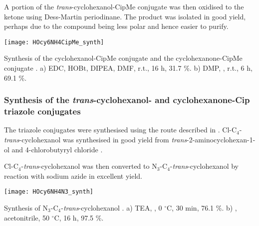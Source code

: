A portion of the \textit{trans}-cyclohexanol-CipMe conjugate  was then oxidised to the ketone using Dess-Martin periodinane. The product was isolated in good yield, perhaps due to the compound being less polar and hence easier to purify.

\begin{scheme}[H]
	\begin{center}
		\texttt{[image: HOcy6NH4CipMe\_synth]}
		\caption{Synthesis of the cyclohexanol-CipMe conjugate  and the cyclohexanone-CipMe conjugate . 
		a) EDC, HOBt, DIPEA, DMF, r.t., 16 h, 31.7 \%.
		b) DMP, , r.t., 6 h, 69.1 \%.
		\label{sch:HOcy6NH4CipMe_synth}}
	\end{center}
\end{scheme}

\subsubsection{Synthesis of the \textit{trans}-cyclohexanol- and cyclohexanone-Cip triazole conjugates}

The triazole conjugates were synthesised using the route described in \label{sec:Cl4Cl}. Cl-C$_4$-\textit{trans}-cyclohexanol  was synthesised in good yield from \textit{trans}-2-aminocyclohexan-1-ol  and 4-chlorobutyryl chloride . 

Cl-C$_4$-\textit{trans}-cyclohexanol  was then converted to N$_3$-C$_4$-\textit{trans}-cyclohexanol  by reaction with sodium azide in excellent yield. 

\begin{scheme}[H]
	\begin{center}
		\texttt{[image: HOcy6NH4N3\_synth]}
		\caption{Synthesis of N$_3$-C$_4$-\textit{trans}-cyclohexanol . 
		a) TEA, , 0 $^{\circ}$C, 30 min, 76.1 \%.
		b) , acetonitrile, 50 $^\circ$C, 16 h, 97.5 \%.
		\label{sch:HOcy6NH4N3_synth}}
	\end{center}
\end{scheme}

